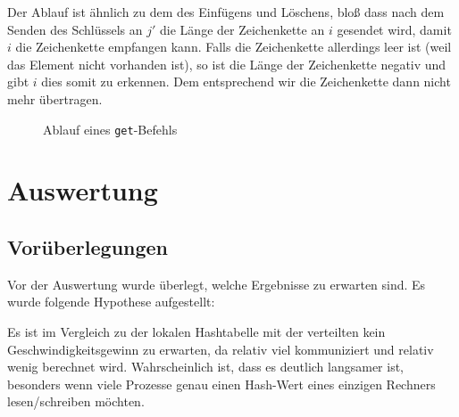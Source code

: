 \documentclass{scrreprt}
\begin{document}
Der Ablauf ist ähnlich zu dem des Einfügens und Löschens, bloß dass nach dem Senden des Schlüssels an $j'$ die Länge der Zeichenkette an $i$ gesendet wird, damit $i$ die Zeichenkette empfangen kann. Falls die Zeichenkette allerdings leer ist (weil das Element nicht vorhanden ist), so ist die Länge der Zeichenkette negativ und gibt $i$ dies somit zu erkennen. Dem entsprechend wir die Zeichenkette dann nicht mehr übertragen.
\begin{figure}[!ht]
\centering
{}
\caption{Ablauf eines \lstinline`get`-Befehls}
\label{fig:disthashget}
\end{figure}

\chapter{Auswertung}

\section{Vorüberlegungen}
\label{sec:hyp}

Vor der Auswertung wurde überlegt, welche Ergebnisse zu erwarten sind. Es wurde folgende Hypothese aufgestellt:

Es ist im Vergleich zu der lokalen Hashtabelle mit der verteilten kein Geschwindigkeitsgewinn zu erwarten, da relativ viel kommuniziert und relativ wenig berechnet wird. Wahrscheinlich ist, dass es deutlich langsamer ist, besonders wenn viele Prozesse genau einen Hash-Wert eines einzigen Rechners lesen/schreiben möchten.
\end{document}
